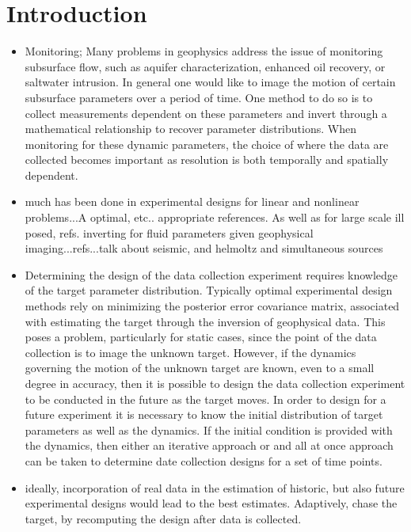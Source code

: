 \documentclass[12pt]{article}
\begin{document}
\section{Introduction} 
\begin{itemize}

\item Monitoring; Many problems in geophysics address the issue of monitoring subsurface flow, such as aquifer characterization, enhanced oil recovery, or saltwater intrusion. In general one would like to image the motion of certain subsurface parameters over a period of time.  One method to do so is to collect measurements dependent on these parameters and invert through a mathematical relationship to recover parameter distributions. When monitoring for these dynamic parameters, the choice of where the data are collected becomes important as resolution is both temporally and spatially dependent. 

\item much has been done in experimental designs for linear and nonlinear problems...A optimal, etc.. appropriate references. As well as for large scale ill posed, refs.  inverting for fluid parameters given geophysical imaging...refs...talk about seismic, and helmoltz and simultaneous sources

\item Determining the design of the data collection experiment requires knowledge of the target parameter distribution. Typically optimal experimental design methods rely on minimizing the posterior error covariance matrix, associated with estimating the target through the inversion of geophysical data. This poses a problem, particularly for static cases, since the point of  the data collection is to image the unknown target. However, if the dynamics governing the motion of the unknown target are known, even to a small degree in accuracy, then it is possible to design the data collection experiment to be conducted in the future as the target moves. In order to design for a future experiment it is necessary to know the initial distribution of target parameters as well as the dynamics. If the initial condition is provided with the dynamics, then either an iterative approach or and all at once approach can be taken to determine date collection designs for a set of time points. 
\item ideally, incorporation of real data in the estimation of historic, but also future experimental designs would lead to the best estimates. Adaptively, chase the target, by recomputing the design after data is collected. 


\end{itemize}
\end{document}
